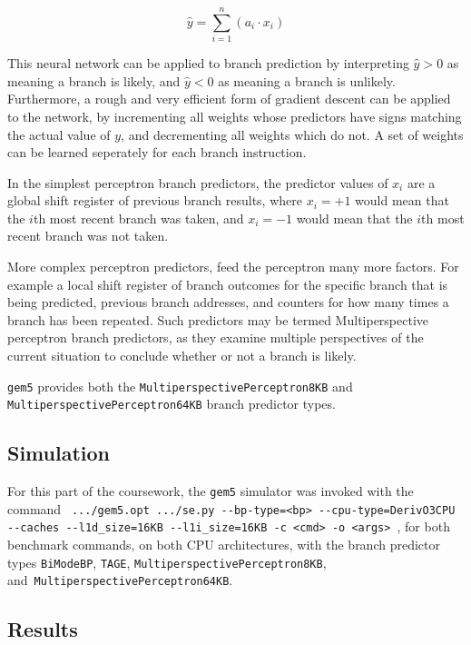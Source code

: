 \begin{equation}
    \hat{y} = \sum_{i=1}^{n} \left( a_i \cdot x_i \right)
    \label{eq:perceptron}
\end{equation}

This neural network can be applied to branch prediction by interpreting
\(\hat{y} > 0\) as meaning a branch is likely, and \(\hat{y} < 0\) as meaning
a branch is unlikely. 
Furthermore, a rough and very efficient form of gradient
descent can be applied to the network, by incrementing all weights whose predictors
have signs matching the actual value of \(y\), and decrementing all weights which
do not. 
A set of weights can be learned seperately for each branch 
instruction.~\cite{Jimenez2001}

In the simplest perceptron branch predictors, the predictor values of \(x_i\)
are a global shift register of previous branch results, where \(x_i = +1\) would
mean that the \(i\)th most recent branch was taken, and \(x_i = -1\) would
mean that the \(i\)th most recent branch was not taken.

More complex perceptron predictors, feed the perceptron many more
factors. For example a local shift register of branch outcomes for the specific
branch that is being predicted, previous branch addresses, and counters for
how many times a branch has been repeated.
Such predictors may be termed
Multiperspective perceptron branch predictors, as they examine multiple
perspectives of the current situation to conclude whether or not a branch
is likely.~\cite{Jimenez2014}

\texttt{gem5} provides both the \texttt{MultiperspectivePerceptron8KB}
and \texttt{MultiperspectivePerceptron64KB} branch predictor types.


\subsection{Simulation}

For this part of the coursework, the \texttt{gem5} simulator was invoked with the
command \texttt{
    .../gem5.opt~.../se.py
    -{}-bp-type=<bp>
    -{}-cpu-type=DerivO3CPU
    -{}-caches
    -{}-l1d\_size=16KB
    -{}-l1i\_size=16KB
    -c~<cmd>
    -o~<args>
}, for both benchmark commands, on both CPU architectures, with the branch
predictor types \texttt{BiModeBP}, \texttt{TAGE},
\texttt{MultiperspectivePerceptron8KB},
and~\texttt{MultiperspectivePerceptron64KB}.

\subsection{Results}

